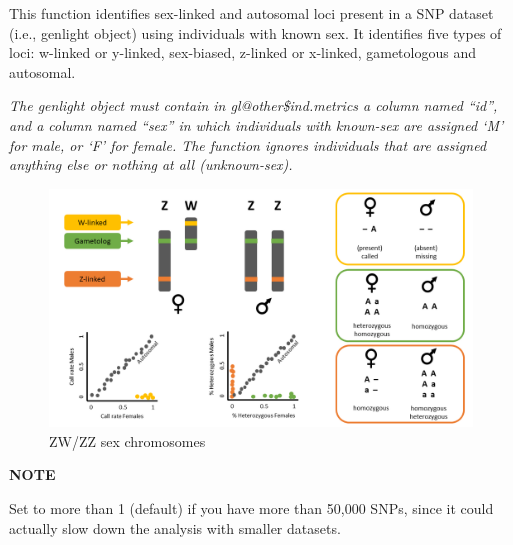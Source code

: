 \documentclass[
  letterpaper,
  DIV=11,
  numbers=noendperiod]{scrreprt}
\newenvironment{Shaded}{\begin{snugshade}}{\end{snugshade}}
\newcommand{\CommentTok}[1]{\textcolor[rgb]{0.38,0.63,0.69}{\textit{#1}}}
\newcommand{\FunctionTok}[1]{\textcolor[rgb]{0.02,0.16,0.49}{#1}}
\newcommand{\NormalTok}[1]{\textcolor[rgb]{0.00,0.44,0.13}{#1}}
\newcommand{\SpecialCharTok}[1]{\textcolor[rgb]{0.25,0.44,0.63}{#1}}
\let\textttOrig\texttt
\renewcommand{\texttt}[1]{\textttOrig{\color{blue}{#1}}}
\begin{document}
\markright{Run \texttt{filter.sex.linked}}

This function identifies sex-linked and autosomal loci present in a SNP
dataset (i.e., genlight object) using individuals with known sex. It
identifies five types of loci: w-linked or y-linked, sex-biased,
z-linked or x-linked, gametologous and autosomal.

\emph{The genlight object must contain in gl@other\$ind.metrics a column
named ``id'', and a column named ``sex'' in which individuals with
known-sex are assigned `M' for male, or `F' for female. The function
ignores individuals that are assigned anything else or nothing at all
(unknown-sex).}

\begin{figure}

{\centering \includegraphics{images/ZW.png}

}

\caption{ZW/ZZ sex chromosomes}

\end{figure}

\textbf{NOTE}

Set \texttt{ncores} to more than 1 (default) if you have more than
50,000 SNPs, since it could actually slow down the analysis with smaller
datasets.

\begin{Shaded}
\end{Shaded}
\end{document}
